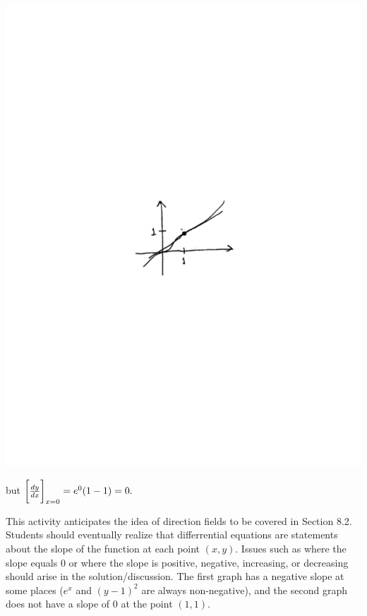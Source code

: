 \documentclass[handout, instructornotes]{ximera}
\begin{document}
\begin{problem}
\begin{freeResponse}
	\begin{image}
	\includegraphics[trim= 170 330 190 330, scale=1]{Figure8-1-3.pdf}	
	\end{image}
	
	but $\eval{\dd[y]{x}}_{x=0} = e^0(1-1) = 0.$
	\end{freeResponse}

\end{problem}

\begin{instructorNotes}
This activity anticipates the idea of direction fields to be covered in Section 8.2.  
Students should eventually realize that differrential equations are statements about the slope of the function at each point $(x,y)$.  
Issues such as where the slope equals $0$ or where the slope is positive, negative, increasing, or decreasing should arise in the solution/discussion.  
The first graph has a negative slope at some places ($e^x$ and $(y-1)^2$ are always non-negative), and the second graph does not have a slope of $0$ at the point $(1,1)$.  
\end{instructorNotes}
















	
	
	
	
	
	
	
	
	

	










								
				
				
	
\end{document}
